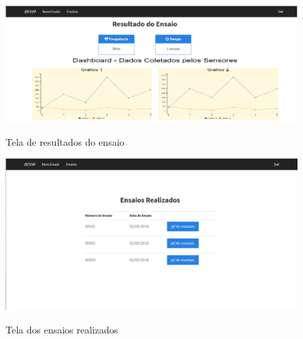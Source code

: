 \begin{figure}[!h]    
\centering
\includegraphics[keepaspectratio=true,scale=0.52]	{figuras/tela_resultado_ensaio.png}
\label{fig:tela_resultado_ensaio}	
\caption{Tela de resultados do ensaio}
\end{figure}
        
\begin{figure}[!h]    
\centering
\includegraphics[keepaspectratio=true,scale=0.40]{figuras/tela_ensaios.png}
\label{fig:tela_ensaios}	
\caption{Tela dos ensaios realizados}
\end{figure}
        